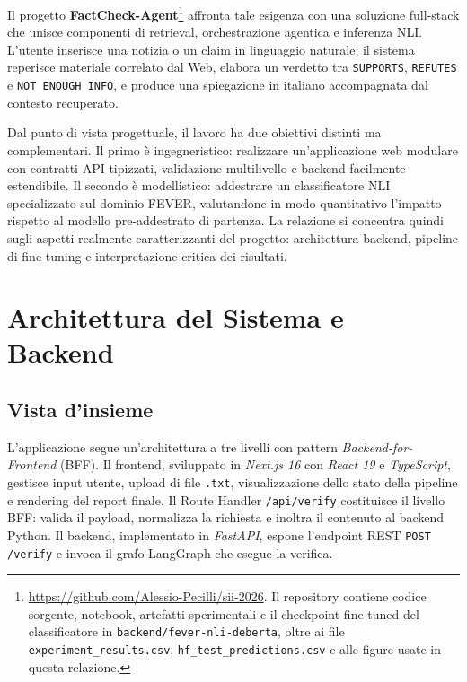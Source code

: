 \documentclass[10pt,a4paper]{article}
\begin{document}
Il progetto \textbf{FactCheck-Agent}\footnote{\url{https://github.com/Alessio-Pecilli/sii-2026}. Il repository contiene codice sorgente, notebook, artefatti sperimentali e il checkpoint fine-tuned del classificatore in \texttt{backend/fever-nli-deberta}, oltre ai file \texttt{experiment\_results.csv}, \texttt{hf\_test\_predictions.csv} e alle figure usate in questa relazione.} affronta tale esigenza con una soluzione full-stack che unisce componenti di retrieval, orchestrazione agentica e inferenza NLI. L'utente inserisce una notizia o un claim in linguaggio naturale; il sistema reperisce materiale correlato dal Web, elabora un verdetto tra \texttt{SUPPORTS}, \texttt{REFUTES} e \texttt{NOT ENOUGH INFO}, e produce una spiegazione in italiano accompagnata dal contesto recuperato.

Dal punto di vista progettuale, il lavoro ha due obiettivi distinti ma complementari. Il primo è ingegneristico: realizzare un'applicazione web modulare con contratti API tipizzati, validazione multilivello e backend facilmente estendibile. Il secondo è modellistico: addestrare un classificatore NLI specializzato sul dominio FEVER, valutandone in modo quantitativo l'impatto rispetto al modello pre-addestrato di partenza. La relazione si concentra quindi sugli aspetti realmente caratterizzanti del progetto: architettura backend, pipeline di fine-tuning e interpretazione critica dei risultati.

\section{Architettura del Sistema e Backend}

\subsection{Vista d'insieme}

L'applicazione segue un'architettura a tre livelli con pattern \textit{Backend-for-Frontend} (BFF). Il frontend, sviluppato in \textit{Next.js 16} con \textit{React 19} e \textit{TypeScript}, gestisce input utente, upload di file \texttt{.txt}, visualizzazione dello stato della pipeline e rendering del report finale. Il Route Handler \texttt{/api/verify} costituisce il livello BFF: valida il payload, normalizza la richiesta e inoltra il contenuto al backend Python. Il backend, implementato in \textit{FastAPI}, espone l'endpoint REST \texttt{POST /verify} e invoca il grafo LangGraph che esegue la verifica.
\end{document}
